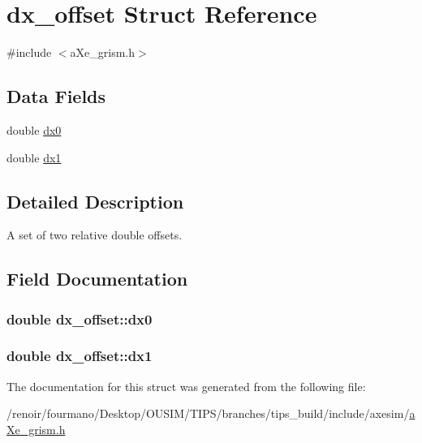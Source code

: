 \hypertarget{structdx__offset}{
\section{dx\_\-offset Struct Reference}
\label{structdx__offset}
}


{\ttfamily \#include $<$aXe\_\-grism.h$>$}\subsection*{Data Fields}
\begin{DoxyCompactItemize}
\item 
double \hyperlink{structdx__offset_a8d48b48cde4412b804a88ad27c2595b6}{dx0}
\item 
double \hyperlink{structdx__offset_ab7e3a76e14af35e5efdf6fcfe32ba834}{dx1}
\end{DoxyCompactItemize}


\subsection{Detailed Description}
A set of two relative double offsets. 

\subsection{Field Documentation}
\hypertarget{structdx__offset_a8d48b48cde4412b804a88ad27c2595b6}{
\subsubsection[{dx0}]{\setlength{\rightskip}{0pt plus 5cm}double {\bf dx\_\-offset::dx0}}}
\label{structdx__offset_a8d48b48cde4412b804a88ad27c2595b6}
\hypertarget{structdx__offset_ab7e3a76e14af35e5efdf6fcfe32ba834}{
\subsubsection[{dx1}]{\setlength{\rightskip}{0pt plus 5cm}double {\bf dx\_\-offset::dx1}}}
\label{structdx__offset_ab7e3a76e14af35e5efdf6fcfe32ba834}


The documentation for this struct was generated from the following file:\begin{DoxyCompactItemize}
\item 
/renoir/fourmano/Desktop/OUSIM/TIPS/branches/tips\_\-build/include/axesim/\hyperlink{aXe__grism_8h}{aXe\_\-grism.h}\end{DoxyCompactItemize}
